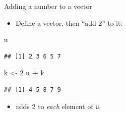 \documentclass[ignorenonframetext,]{beamer}
\newenvironment{Shaded}{\begin{snugshade}}{\end{snugshade}}
\newcommand{\DecValTok}[1]{\textcolor[rgb]{0.00,0.00,0.81}{#1}}
\newcommand{\NormalTok}[1]{#1}
\newcommand{\OperatorTok}[1]{\textcolor[rgb]{0.81,0.36,0.00}{\textbf{#1}}}
\newcommand{\StringTok}[1]{\textcolor[rgb]{0.31,0.60,0.02}{#1}}
\providecommand{\tightlist}{%
  \setlength{\itemsep}{0pt}\setlength{\parskip}{0pt}}
\begin{document}
\begin{frame}[fragile]{Adding a number to a vector}
\protect\hypertarget{adding-a-number-to-a-vector}{}

\begin{itemize}
\tightlist
\item
  Define a vector, then ``add 2'' to it:
\end{itemize}

\begin{Shaded}
\begin{Highlighting}[]
\NormalTok{u}
\end{Highlighting}
\end{Shaded}

\begin{verbatim}
## [1] 2 3 6 5 7
\end{verbatim}

\begin{Shaded}
\begin{Highlighting}[]
\NormalTok{k <-}\StringTok{ }\DecValTok{2}
\NormalTok{u }\OperatorTok{+}\StringTok{ }\NormalTok{k}
\end{Highlighting}
\end{Shaded}

\begin{verbatim}
## [1] 4 5 8 7 9
\end{verbatim}

\begin{itemize}
\tightlist
\item
  adds 2 to \emph{each} element of \texttt{u}.
\end{itemize}

\end{frame}
\end{document}
